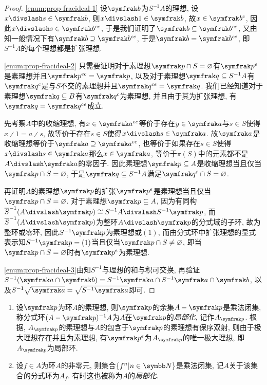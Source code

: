 \begin{proof}
    \ref{enum:prop-fracideal-1} 设$\ideal{b}$为$S^{-1}A$的理想, 设$x{\divslash}s\in \ideal{b}$, 则$x{\divslash}1\in\ideal{b}$, 故$x\in\ideal{b}^c$, 因此$x{\divslash}s\in\ideal{b}^{ce}$, 于是我们证明了$\ideal{b}\subseteq\ideal{b}^{ce}$, 又由知一般情况下有$\ideal{b}\supseteq\ideal{b}^{ce}$, 于是$\ideal{b}=\ideal{b}^{ce}$, 即$S^{-1}A$的每个理想都是扩张理想.

    \ref{enum:prop-fracideal-2} 只需要证明对于素理想$\ideal{p}\cap S=\varnothing$有$\ideal{p}^e$是素理想并且$\ideal{p}^{ec}=\ideal{p}$, 以及对于素理想$\ideal{q}\subseteq S^{-1}A$有$\ideal{q}^c$是与$S$不交的素理想并且$\ideal{q}^{ce}=\ideal{q}$. 我们已经知道对于素理想$\ideal{q}\subseteq B$有$\ideal{q}^c$为素理想, 并且由于其为扩张理想, 有$\ideal{q}=\ideal{q}^{ce}$成立.

    先考察$A$中的收缩理想, 有$x\in\ideal{a}^{ec}$等价于存在$y\in\ideal{a}$与$s\in S$使得$x{\divslash}1=a{\divslash}s$, 故等价于存在$s\in S$使得$x{\divslash}s\in\ideal{a}$. 故$\ideal{a}$是收缩理想等价于$\ideal{a}\supseteq\ideal{a}^{ec}$, 也等价于如果存在$s\in S$使得$x{\divslash}s\in\ideal{a}$那么$x\in\ideal{a}$, 等价于$\pi(S)$中的元素都不是$A{\divslash}\ideal{a}$的零因子. 因此素理想$\ideal{p}\subseteq A$是收缩理想当且仅当$\ideal{p}\cap S=\varnothing$, 于是$\ideal{q}\subseteq S^{-1}A$满足$\ideal{q}^c\cap S=\varnothing$.

    再证明$A$的素理想$\ideal{p}$的扩张$\ideal{p}^e$是素理想当且仅当$\ideal{p}\cap S=\varnothing$. 对于素理想$\ideal{p}\subseteq A$, 因为有同构$\overline{S}^{-1}(A{\divslash}\ideal{p})\cong S^{-1}A{\divslash}S^{-1}\ideal{p}$, 而$\overline{S}^{-1}(A{\divslash}\ideal{p})$为整环$A{\divslash}\ideal{p}$的分式域的子环, 故为整环或零环, 因此$S^{-1}\ideal{p}$为素理想或$(1)$, 而由分式环中扩张理想的显式表示知$S^{-1}\ideal{p}=(1)$当且仅当$\ideal{p}\cap S\neq\varnothing$, 即当$\ideal{p}\cap S=\varnothing$时有$\ideal{p}^e$为素理想.

    \ref{enum:prop-fracideal-3}由知$S^{-1}$与理想的和与积可交换, 再验证$S^{-1}(\ideal{a}\cap\ideal{b})=S^{-1}\ideal{a}\cap S^{-1}\ideal{a}\cap\ideal{b}$, 以及$S^{-1}\sqrt{\ideal{a}}=\sqrt{S^{-1}\ideal{a}}$即可.
\end{proof}

\begin{example}\leavevmode\vspace{-\baselineskip}%
    \begin{enumerate}
        \item 设$\ideal{p}$为环$A$的素理想, 则$\ideal{p}$的余集$A-\ideal{p}$是乘法闭集, 称分式环$(A-\ideal{p})^{-1}A$为$A$在$\ideal{p}$的\emph{局部化}, 记作$A_{\ideal{p}}$. 根据, $A_{\ideal{p}}$的素理想与$A$的包含于$\ideal{p}$的素理想有保序双射, 则由于极大理想存在并且为素理想, 有$\ideal{p}^e$为$A_{\ideal{p}}$的唯一极大理想, 即$A_{\ideal{p}}$为局部环.
        \item 设$f\in A$为环$A$的非零元, 则集合$\{f^n\vert n\in \NN\}$是乘法闭集, 记$A$关于该集合的分式环为$A_f$. 有时这也被称为$A$的\emph{局部化}.
    \end{enumerate}
\end{example}

